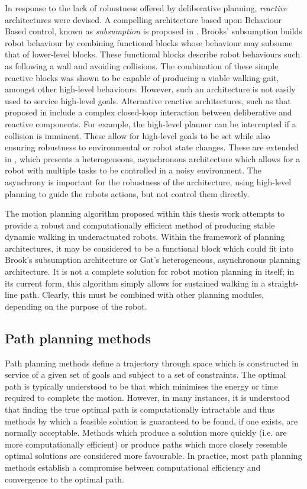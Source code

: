 In response to the lack of robustness offered by deliberative planning, \textit{reactive} architectures were devised. A compelling architecture based upon Behaviour Based control, known as \textit{subsumption} is proposed in \cite{brooks1986robust}. Brooks' subsumption builds robot behaviour by combining functional blocks whose behaviour may subsume that of lower-level blocks. These functional blocks describe robot behaviours such as following a wall and avoiding collisions. The combination of these simple reactive blocks was shown to be capable of producing a viable walking gait, amongst other high-level behaviours. However, such an architecture is not easily used to service high-level goals. Alternative reactive architectures, such as that proposed in \cite{georgeff1987reactive} include a complex closed-loop interaction between deliberative and reactive components. For example, the high-level planner can be interrupted if a collision is imminent. These allow for high-level goals to be set while also ensuring robustness to environmental or robot state changes. These are extended in \cite{gat1992integrating}, which presents a heterogeneous, asynchronous architecture which allows for a robot with multiple tasks to be controlled in a noisy environment. The asynchrony is important for the robustness of the architecture, using high-level planning to guide the robots actions, but not control them directly. 

The motion planning algorithm proposed within this thesis work attempts to provide a robust and computationally efficient method of producing stable dynamic walking in underactuated robots. Within the framework of planning architectures, it may be considered to be a functional block which could fit into Brook's subsumption architecture or Gat's heterogeneous, asynchronous planning architecture. It is not a complete solution for robot motion planning in itself; in its current form, this algorithm simply allows for sustained walking in a straight-line path. Clearly, this must be combined with other planning modules, depending on the purpose of the robot.

\subsection{Path planning methods}
Path planning methods define a trajectory through space which is constructed in service of a given set of goals and subject to a set of constraints. The optimal path is typically understood to be that which minimises the energy or time required to complete the motion. However, in many instances, it is understood that finding the true optimal path is computationally intractable and thus methods by which a feasible solution is guaranteed to be found, if one exists, are normally acceptable. Methods which produce a solution more quickly (i.e. are more computationally efficient) or produce paths which more closely resemble optimal solutions are considered more favourable. In practice, most path planning methods establish a compromise between computational efficiency and convergence to the optimal path. 

